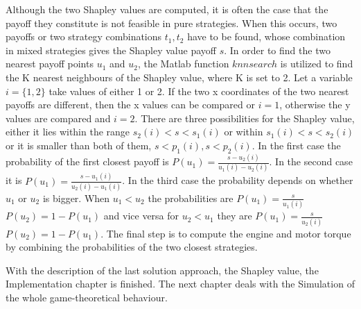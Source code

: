Although the two Shapley values are computed, it is often the case that the payoff they constitute is not feasible in pure strategies. When this occurs, two payoffs or two strategy combinations $t_1, t_2$ have to be found, whose combination in mixed strategies gives the Shapley value payoff $s$. In order to find the two nearest payoff points $u_1$ and $u_2$, the Matlab function $knnsearch$ is utilized to find the K nearest neighbours of the Shapley value, where K is set to 2. Let a variable $i=\{1,2\}$ take values of either 1 or 2. If the two x coordinates of the two nearest payoffs are different, then the x values can be compared or $i=1$, otherwise the y values are compared and $i=2$. There are three possibilities for the Shapley value, either it lies within the range $s_2(i) < s < s_1(i)$ or within $s_1(i) < s < s_2(i)$ or it is smaller than both of them, $s < p_1(i), s < p_2(i)$. In the first case the probability of the first closest payoff is $P(u_1) = \frac{s - u_2(i)}{u_1(i)-u_2(i)}$. In the second case it is $P(u_1) = \frac{s - u_1(i)}{u_2(i)-u_1(i)}$. In the third case the probability depends on whether $u_1$ or $u_2$ is bigger. When $u_1 < u_2$ the probabilities are $P(u_1) = \frac{s}{u_1(i)}$ $P(u_2) = 1 - P(u_1)$ and vice versa for $u_2 < u_1$ they are $P(u_1) = \frac{s}{u_2(i)}$ $P(u_2) = 1 - P(u_1)$. The final step is to compute the engine and motor torque by combining the probabilities of the two closest strategies.

With the description of the last solution approach, the Shapley value, the Implementation chapter is finished. The next chapter deals with the Simulation of the whole game-theoretical behaviour.